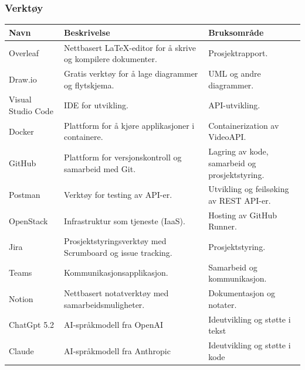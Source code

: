 \subsubsection{Verktøy}
\sloppy
\begin{table}[H]
\centering
\renewcommand{\arraystretch}{1.4}

\begin{tabular}{l p{5cm} p{6cm}}
\hline
\textbf{Navn} & \textbf{Beskrivelse} & \textbf{Bruksområde} \\
\hline

Overleaf & Nettbasert LaTeX-editor for å skrive og kompilere dokumenter. 
& Prosjektrapport. \\

Draw.io & Gratis verktøy for å lage diagrammer og flytskjema. 
& UML og andre diagrammer. \\

Visual Studio Code & IDE for utvikling. 
& API-utvikling. \\ 

Docker & Plattform for å kjøre applikasjoner i containere. 
& Containerization av VideoAPI. \\

GitHub & Plattform for versjonskontroll og samarbeid med Git. 
& Lagring av kode, samarbeid og prosjektstyring. \\

Postman & Verktøy for testing av API-er. 
& Utvikling og feilsøking av REST API-er. \\

OpenStack & Infrastruktur som tjeneste (IaaS). 
& Hosting av GitHub Runner. \\

Jira & Prosjektstyringsverktøy med Scrumboard og issue tracking. 
& Prosjektstyring. \\

Teams & Kommunikasjons\-applikasjon. & Samarbeid og kommunikasjon. \\

Notion & Nettbasert notatverktøy med samarbeidsmuligheter. 
& Dokumentasjon og notater. \\

ChatGpt 5.2 & AI-språkmodell fra OpenAI & Ideutvikling og støtte i tekst \\

Claude & AI-språkmodell fra Anthropic & Ideutvikling og støtte i kode \\

\hline
\end{tabular}

\end{table}